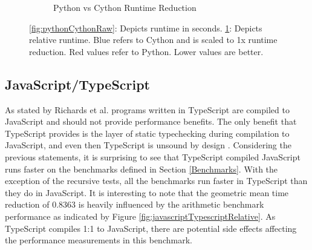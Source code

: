 \begin{figure}[H]
\begin{subfigure}{.5\textwidth}
  \caption{Python vs Cython Runtime Reduction}
  \label{fig:pythonCythonRelative}
\end{subfigure}
\caption{\ref{fig:pythonCythonRaw}: Depicts runtime in seconds. \ref{fig:pythonCythonRelative}: Depicts relative runtime. Blue refers to Cython  and is scaled to 1x runtime reduction. Red values refer to Python. Lower values are better.}
\label{fig:pythonCython}
\end{figure}


\subsection{JavaScript/TypeScript}
As stated by Richards et al. programs written in TypeScript are compiled to JavaScript and should not provide performance benefits. The only benefit that TypeScript provides is the layer of static typechecking during compilation to JavaScript, and even then TypeScript is unsound by design \cite{bierman2014understanding}. Considering the previous statements, it is surprising to see that TypeScript compiled JavaScript runs faster on the benchmarks defined in Section \ref{Benchmarks}. With the exception of the recursive tests, all the benchmarks run faster in TypeScript than they do in JavaScript. It is interesting to note that the geometric mean time reduction of 0.8363 is heavily influenced by the arithmetic benchmark performance as indicated by Figure \ref{fig:javascriptTypescriptRelative}. As TypeScript compiles 1:1 to JavaScript, there are potential side effects affecting the performance measurements in this benchmark. 

